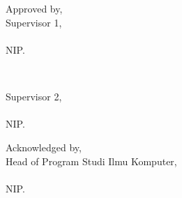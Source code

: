 \newpage
\begin{center}
    \textbf{\MakeUppercase{\penulis}}\\
    \textbf{\nim}\\
\end{center}

\begin{center}
    \begin{doublespace}
        \textbf{\MakeUppercase{\judul}}
    \end{doublespace}
\end{center}

\vfill
\begin{center}
    \begin{minipage}{0.50\textwidth}
        \centering
        Approved by,\\
        Supervisor 1,\\[2cm]
        \pembimbingsatu{}\\
        NIP.\ \NIPpbbsatu{}\\
    \end{minipage}
    \\[1cm]
    \begin{minipage}{0.50\textwidth}
        \centering
        Supervisor 2,\\[2cm]
        \pembimbingdua{}\\
        NIP.\ \NIPpbbdua{}\\
    \end{minipage}
\end{center}

\vfill
\begin{center}
    \begin{minipage}{0.50\textwidth}
        \centering
        Acknowledged by,\\
        Head of Program Studi Ilmu Komputer,\\[2cm]
        \pembimbingdua{}\\
        NIP.\ \NIPpbbdua{}\\
    \end{minipage}
\end{center}
\vfill
